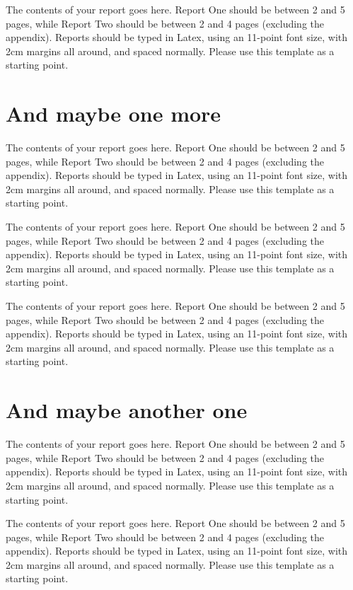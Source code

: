 \documentclass[a4paper,11pt]{article}
\begin{document}
The contents of your report goes here.  Report One should be between 2
and 5 pages, while Report Two should be between 2 and 4 pages
(excluding the appendix).  Reports should be typed in Latex, using an
11-point font size, with 2cm margins all around, and spaced normally.
Please use this template as a starting point.


\section{And maybe one more}

The contents of your report goes here.  Report One should be between 2
and 5 pages, while Report Two should be between 2 and 4 pages
(excluding the appendix).  Reports should be typed in Latex, using an
11-point font size, with 2cm margins all around, and spaced normally.
Please use this template as a starting point.

The contents of your report goes here.  Report One should be between 2
and 5 pages, while Report Two should be between 2 and 4 pages
(excluding the appendix).  Reports should be typed in Latex, using an
11-point font size, with 2cm margins all around, and spaced normally.
Please use this template as a starting point.

The contents of your report goes here.  Report One should be between 2
and 5 pages, while Report Two should be between 2 and 4 pages
(excluding the appendix).  Reports should be typed in Latex, using an
11-point font size, with 2cm margins all around, and spaced normally.
Please use this template as a starting point.


\section{And maybe another one}

The contents of your report goes here.  Report One should be between 2
and 5 pages, while Report Two should be between 2 and 4 pages
(excluding the appendix).  Reports should be typed in Latex, using an
11-point font size, with 2cm margins all around, and spaced normally.
Please use this template as a starting point.

The contents of your report goes here.  Report One should be between 2
and 5 pages, while Report Two should be between 2 and 4 pages
(excluding the appendix).  Reports should be typed in Latex, using an
11-point font size, with 2cm margins all around, and spaced normally.
Please use this template as a starting point.
\end{document}
